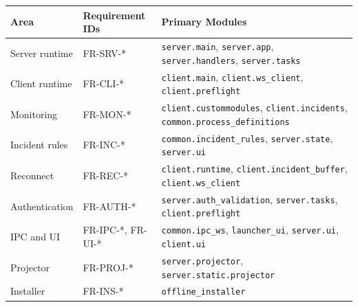 \documentclass[12pt,a4paper]{article}
\begin{document}
\begin{longtable}{L{0.24\textwidth} L{0.28\textwidth} L{0.38\textwidth}}
\textbf{Area} & \textbf{Requirement IDs} & \textbf{Primary Modules} \\
\hline
Server runtime & FR-SRV-* & \texttt{server.main}, \texttt{server.app}, \texttt{server.handlers}, \texttt{server.tasks} \\
Client runtime & FR-CLI-* & \texttt{client.main}, \texttt{client.ws\_client}, \texttt{client.preflight} \\
Monitoring & FR-MON-* & \texttt{client.custommodules}, \texttt{client.incidents}, \texttt{common.process\_definitions} \\
Incident rules & FR-INC-* & \texttt{common.incident\_rules}, \texttt{server.state}, \texttt{server.ui} \\
Reconnect & FR-REC-* & \texttt{client.runtime}, \texttt{client.incident\_buffer}, \texttt{client.ws\_client} \\
Authentication & FR-AUTH-* & \texttt{server.auth\_validation}, \texttt{server.tasks}, \texttt{client.preflight} \\
IPC and UI & FR-IPC-*, FR-UI-* & \texttt{common.ipc\_ws}, \texttt{launcher\_ui}, \texttt{server.ui}, \texttt{client.ui} \\
Projector & FR-PROJ-* & \texttt{server.projector}, \texttt{server.static.projector} \\
Installer & FR-INS-* & \texttt{offline\_installer} \\
\end{longtable}
\end{document}
